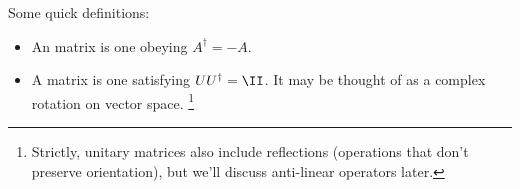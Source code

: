 Some quick definitions:
\begin{itemize}
    \item An  matrix is one obeying $A^\dagger=-A$.
    \item A  matrix is one satisfying $UU^\dagger = \II$. It may be thought of as a complex rotation on vector space.%
        \footnote{Strictly, unitary matrices also include reflections (operations that don't preserve orientation), but we'll discuss anti-linear operators later.}
\end{itemize}
    